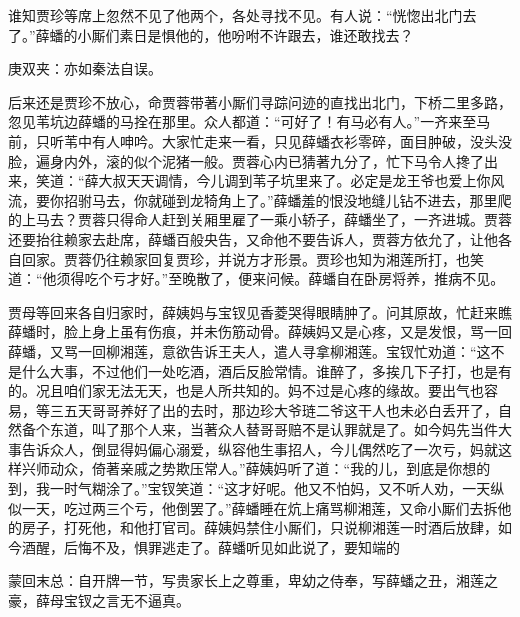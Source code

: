 \begin{parag}
    谁知贾珍等席上忽然不见了他两个，各处寻找不见。有人说：“恍惚出北门去了。”薛蟠的小厮们素日是惧他的，他吩咐不许跟去，谁还敢找去？\begin{note}庚双夹：亦如秦法自误。\end{note}后来还是贾珍不放心，命贾蓉带著小厮们寻踪问迹的直找出北门，下桥二里多路，忽见苇坑边薛蟠的马拴在那里。众人都道：“可好了！有马必有人。”一齐来至马前，只听苇中有人呻吟。大家忙走来一看，只见薛蟠衣衫零碎，面目肿破，没头没脸，遍身内外，滚的似个泥猪一般。贾蓉心内已猜著九分了，忙下马令人搀了出来，笑道：“薛大叔天天调情，今儿调到苇子坑里来了。必定是龙王爷也爱上你风流，要你招驸马去，你就碰到龙犄角上了。”薛蟠羞的恨没地缝儿钻不进去，那里爬的上马去？贾蓉只得命人赶到关厢里雇了一乘小轿子，薛蟠坐了，一齐进城。贾蓉还要抬往赖家去赴席，薛蟠百般央告，又命他不要告诉人，贾蓉方依允了，让他各自回家。贾蓉仍往赖家回复贾珍，并说方才形景。贾珍也知为湘莲所打，也笑道：“他须得吃个亏才好。”至晚散了，便来问候。薛蟠自在卧房将养，推病不见。
\end{parag}


\begin{parag}
    贾母等回来各自归家时，薛姨妈与宝钗见香菱哭得眼睛肿了。问其原故，忙赶来瞧薛蟠时，脸上身上虽有伤痕，并未伤筋动骨。薛姨妈又是心疼，又是发恨，骂一回薛蟠，又骂一回柳湘莲，意欲告诉王夫人，遣人寻拿柳湘莲。宝钗忙劝道：“这不是什么大事，不过他们一处吃酒，酒后反脸常情。谁醉了，多挨几下子打，也是有的。况且咱们家无法无天，也是人所共知的。妈不过是心疼的缘故。要出气也容易，等三五天哥哥养好了出的去时，那边珍大爷琏二爷这干人也未必白丢开了，自然备个东道，叫了那个人来，当著众人替哥哥赔不是认罪就是了。如今妈先当件大事告诉众人，倒显得妈偏心溺爱，纵容他生事招人，今儿偶然吃了一次亏，妈就这样兴师动众，倚著亲戚之势欺压常人。”薛姨妈听了道：“我的儿，到底是你想的到，我一时气糊涂了。”宝钗笑道：“这才好呢。他又不怕妈，又不听人劝，一天纵似一天，吃过两三个亏，他倒罢了。”薛蟠睡在炕上痛骂柳湘莲，又命小厮们去拆他的房子，打死他，和他打官司。薛姨妈禁住小厮们，只说柳湘莲一时酒后放肆，如今酒醒，后悔不及，惧罪逃走了。薛蟠听见如此说了，要知端的
\end{parag}


\begin{parag}
    \begin{note}蒙回末总：自开牌一节，写贵家长上之尊重，卑幼之侍奉，写薛蟠之丑，湘莲之豪，薛母宝钗之言无不逼真。\end{note}
\end{parag}

